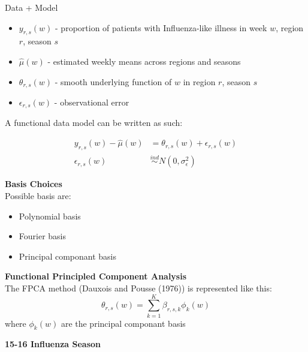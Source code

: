 \documentclass[final]{beamer}
\newlength{\onecolwid}
\begin{document}
\begin{frame}[t]
\begin{columns}[t]
\begin{column}{\onecolwid}
\begin{block}{Data + Model}

\begin{itemize}
\item $y_{r,s}(w)$ - proportion of patients with Influenza-like illness in week $w$, region $r$, season $s$
\item $\hat{\mu}(w)$ - estimated weekly means across regions and seasons
\item $\theta_{r,s}(w)$ - smooth underlying function of $w$ in region $r$, season $s$
\item $\epsilon_{r,s}(w)$ - observational error
\end{itemize}

A functional data model can be written as such:

\begin{align}
y_{r,s}(w) - \hat{\mu}(w) &= \theta_{r,s}(w) + \epsilon_{r,s}(w) \\
\epsilon_{r,s}(w) &\overset{ind}{\sim} N(0,\sigma^2_{\epsilon}) \nonumber
\end{align}


\textbf{Basis Choices} \\

Possible basis are: \\

\begin{itemize}
\item Polynomial basis
\item Fourier basis
\item Principal componant basis \\
\end{itemize}

\vspace{10mm}

\textbf{Functional Principled Component Analysis} \\

The FPCA method (Dauxois and Pousse (1976)) is represented like this:
\begin{equation}
  \theta_{r,s} (w) = \sum_{k=1}^{K} \beta_{r,s,k} \phi_k (w)
\end{equation}
where $\phi_k (w)$ are the principal componant basis

\vspace{10mm}

\textbf{15-16 Influenza Season}

\end{block}


\end{column}
\end{columns}
\end{frame}
\end{document}
